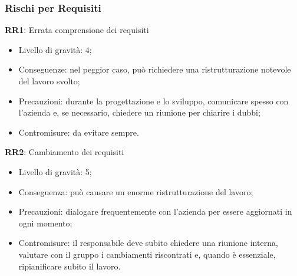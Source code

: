 \subsubsection{Rischi per Requisiti}
\textbf{RR1}: 
Errata comprensione dei requisiti
\begin{itemize}
\item Livello di gravità: 4;
\item Conseguenze: nel peggior caso, può richiedere una ristrutturazione notevole del lavoro svolto;
\item Precauzioni: durante la progettazione e lo sviluppo, comunicare spesso con l’azienda e, se necessario, chiedere un riunione per chiarire i dubbi;
\item Contromisure: da evitare sempre.
\end{itemize}
\textbf{RR2}:
Cambiamento dei requisiti
\begin{itemize}
\item Livello di gravità: 5;
\item Conseguenza: può causare un enorme ristrutturazione del lavoro;
\item Precauzioni: dialogare frequentemente con l'azienda per essere aggiornati in ogni momento;
\item Contromisure: il responsabile deve subito chiedere una riunione interna, valutare con il gruppo i cambiamenti riscontrati e, quando è essenziale, ripianificare subito il lavoro.
\end{itemize}



